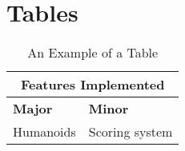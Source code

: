\section{Tables}
\label{TablesAppendix}

\begin{table}[htbp]
\caption{An Example of a Table}
\begin{center}
\begin{tabular}{|ll|}
\hline
\multicolumn{2}{|c|}{\textbf{Features Implemented}}     \\ \hline
\multicolumn{1}{|l|}{\textbf{Major}} & \textbf{Minor}   \\ \hline
\multicolumn{1}{|l|}{Humanoids}      & Scoring system   \\ \hline
\end{tabular}
\label{tblFeatures}
\end{center}
\end{table}
